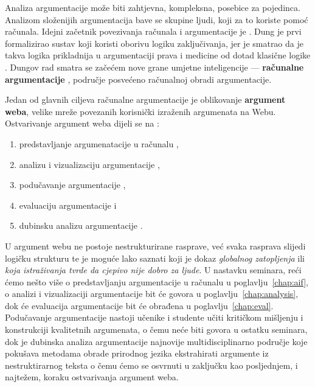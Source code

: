 Analiza argumentacije može biti zahtjevna, kompleksna, posebice
za pojedinca. Analizom složenijih argumentacija bave se skupine ljudi,
koji za to koriste pomoć računala. 
Idejni začetnik povezivanja računala i argumentacije je 
\cite{dung1995acceptability}. Dung je prvi formalizirao sustav koji 
koristi oborivu  logiku zaključivanja, jer je smatrao da 
je takva logika prikladnija u argumentaciji prava i medicine
od dotad klasične logike . 
Dungov rad smatra se začećem nove grane umjetne inteligencije ---
\textbf{računalne argumentacije} , područje 
posvećeno računalnoj obradi argumentacije. 

Jedan od glavnih ciljeva računalne argumentacije je oblikovanje 
\textbf{argument weba}, velike mreže povezanih 
korisnički izraženih argumenata na Webu. Ostvarivanje argument weba 
dijeli se na \citep{Chris2017-REETAW}:
\begin{enumerate}
    \item predstavljanje argumenatacije u računalu ,
    \item analizu i vizualizaciju argumentacije ,
    \item podučavanje argumentacije ,
    \item evaluaciju argumentacije  i
    \item dubinsku analizu argumentacije . 
\end{enumerate}
U argument webu ne postoje nestrukturirane rasprave, već
svaka rasprava slijedi logičku strukturu te je moguće
lako saznati koji je dokaz \emph{globalnog zatopljenja} ili
\emph{koja istraživanja tvrde da cjepivo nije dobro za ljude}.
U nastavku seminara, reći ćemo nešto više o predstavljanju 
argumentacije u računalu u poglavlju~\ref{chap:aif}, 
o analizi i vizualizaciji argumentacije bit će 
govora u poglavlju~\ref{chap:analysis}, dok će evaluacija argumentacije 
bit će obrađena u poglavlju~\ref{chap:eval}. 
Podučavanje argumentacije nastoji učenike i studente učiti kritičkom 
mišljenju i konstrukciji kvalitetnih argumenata, o čemu neće biti 
govora u ostatku seminara, dok je
dubinska analiza argumentacije najnovije multidisciplinarno područje 
koje pokušava metodama obrade prirodnog jezika 
ekstrahirati argumente iz nestruktirarnog teksta
o čemu ćemo se osvrnuti u zaključku kao
posljednjem, i najtežem, koraku ostvarivanja argument weba.

